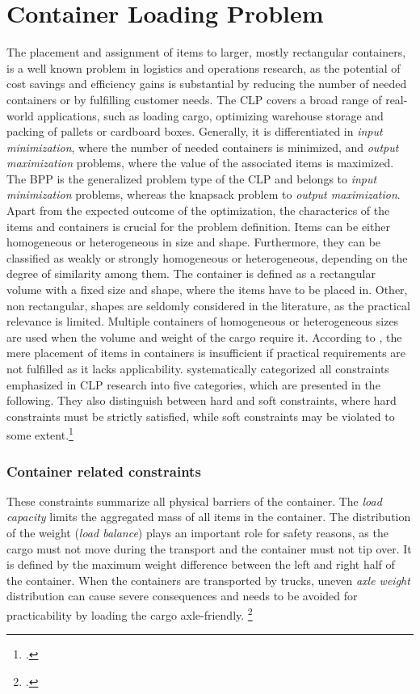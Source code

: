 \section{Container Loading Problem}
\label{sec:clp_definition}

The placement and assignment of items to larger, mostly rectangular
containers, is a well known problem in logistics and operations research, as the
potential of cost savings and efficiency gains is substantial by reducing the number
of needed containers or by fulfilling customer needs. The \gls{CLP} covers a broad range of real-world applications,
such as loading cargo, optimizing warehouse storage and packing of pallets or cardboard boxes.
Generally, it is differentiated in \textit{input minimization},
where the number of needed containers is minimized, and \textit{output maximization} problems,
where the value of the associated items is maximized. The \gls{BPP} is the generalized problem type of the \gls{CLP}
and belongs to \textit{input minimization} problems, whereas the knapsack problem to \textit{output maximization}.
Apart from the expected outcome of the optimization,
the characterics of the items and containers is crucial for the problem definition. Items can be either
homogeneous or heterogeneous in size and shape. Furthermore, they can be classified as weakly or strongly
homogeneous or heterogeneous, depending on the degree of similarity among them. The container is
defined as a rectangular volume with a fixed size and shape, where the items have to be placed in.
Other, non rectangular, shapes are seldomly considered in the literature, as the practical relevance is
limited.
Multiple containers of homogeneous or heterogeneous sizes are used when the volume and weight
of the cargo require it.
According to \textcite{bischoff_issues_1995}, the mere placement of items in containers is insufficient
if practical requirements are not fulfilled as it lacks applicability.
\textcite{bortfeldt_constraints_2013} systematically categorized all constraints emphasized in \gls{CLP} research
into five categories, which are presented in the following. They also distinguish between hard and soft constraints,
where hard constraints must be strictly satisfied, while soft constraints may be violated
to some extent.\footcites(cf.)()[p. 1f]{bortfeldt_constraints_2013}[p. 1f]{bischoff_issues_1995}

\subsubsection{Container related constraints}
These constraints summarize all physical barriers of the container. The \textit{load capacity} limits the aggregated
mass of all items in the container. The distribution of the weight (\textit{load balance})
plays an important role for safety reasons, as the cargo must not move during the transport and the container
must not tip over. It is defined by the maximum weight difference between the left and right half of the container.
When the containers are transported by trucks, uneven \textit{axle weight} distribution can cause severe
consequences and needs to be avoided for practicability by loading the cargo axle-friendly. \footcite[cf.][p. 849f]{krebs_advanced_2021}

